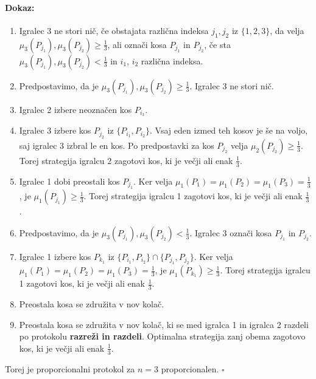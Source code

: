 \documentclass[a4paper, 12pt]{article}
\newenvironment{dokaz}{\paragraph{Dokaz:}}{\hfill$\square$\\}
\begin{document}
\begin{dokaz}
\begin{enumerate}
			\item \qquad Igralec 3 ne stori nič, če obstajata različna indeksa $j_1, j_2$ iz $\{1, 2, 3\}$, da velja $\mu_3 (P_{j_1}), \mu_3 (P_{j_2}) \geq \frac{1}{3}$, ali označi kosa $P_{j_1}$ in $P_{j_2}$, če sta $\mu_3 (P_{j_1}), \mu_3 (P_{j_2}) < \frac{1}{3}$ in $i_1$, $i_2$ različna indeksa.
			
			\item[] \qquad Predpostavimo, da je $\mu_3 (P_{j_1}), \mu_3 (P_{j_2}) \geq \frac{1}{3}$. Igralec 3 ne stori nič.
			
			\setcounter{enumi}{3}
			
			\item \qquad \qquad Igralec 2 izbere neoznačen kos $P_{i_3}$.
			
			\item \qquad \qquad Igralec 3 izbere kos $P_{j_2}$ iz $\{P_{i_1}, P_{i_2}\}$. Vsaj eden izmed teh kosov je še na voljo, saj igralec 3 izbral le en kos. Po predpostavki za kos $P_{j_2}$ velja $\mu_2 (P_{j_2}) \geq \frac{1}{3}$. Torej strategija igralcu 2 zagotovi kos, ki je večji ali enak $\frac{1}{3}$.
			
			\item \qquad \qquad Igralec 1 dobi preostali kos $P_{j_1}$. Ker velja $\mu_1 (P_1) = \mu_1 (P_2) = \mu_1 (P_3) = \frac{1}{3}$, je $\mu_1 (P_{j_1}) \geq \frac{1}{3}$. Torej strategija igralcu 1 zagotovi kos, ki je večji ali enak $\frac{1}{3}$.
			
			\item[] \qquad Predpostavimo, da je $\mu_3 (P_{j_1}), \mu_3 (P_{j_2}) < \frac{1}{3}$. Igralec 3 označi kosa $P_{j_1}$ in $P_{j_2}$.
			
			\setcounter{enumi}{3}
			
			\item \qquad \qquad Igralec 1 izbere kos $P_{k_1}$ iz $\{P_{i_1}, P_{i_2}\} \cap \{P_{j_1}, P_{j_2}\}$. Ker velja $\mu_1 (P_1) = \mu_1 (P_2) = \mu_1 (P_3) = \frac{1}{3}$, je $\mu_1 (P_{k_1}) \geq \frac{1}{3}$. Torej strategija igralcu 1 zagotovi kos, ki je večji ali enak $\frac{1}{3}$.
			
			\item \qquad \qquad Preostala kosa se združita v nov kolač.
			
			\item \qquad \qquad Preostala kosa se združita v nov kolač, ki se med igralca 1 in igralca 2 razdeli po protokolu \textbf{razreži in razdeli}. Optimalna strategija zanj obema zagotovo kos, ki je večji ali enak $\frac{1}{3}$.
			
		\end{enumerate}
		Torej je proporcionalni protokol za $n = 3$ proporcionalen.
	\end{dokaz}
\end{document}
